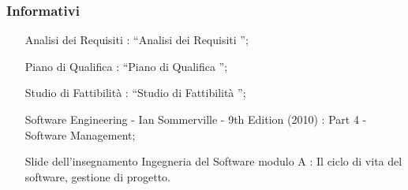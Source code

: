 		\subsubsection{Informativi}
			\begin{itemize}
				\item[Analisi dei Requisiti]: “Analisi dei Requisiti \lastversion”;
				\item[Piano di Qualifica]: “Piano di Qualifica \lastversion”;
				\item[Studio di Fattibilità]: “Studio di Fattibilità \lastversion”;
				\item[Software Engineering - Ian Sommerville - 9th Edition (2010)]: Part 4 - Software Management;
				\item[Slide dell’insegnamento Ingegneria del Software modulo A]: Il ciclo di vita del software, gestione di progetto.
			\end{itemize}

